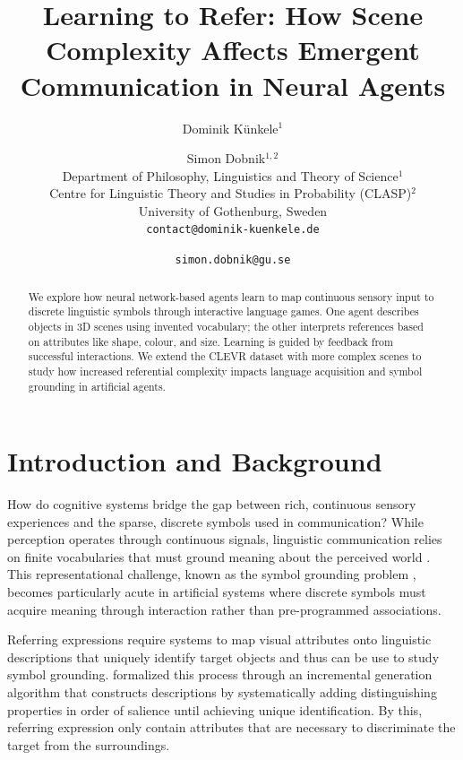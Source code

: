 \documentclass[11pt]{article}
\title{Learning to Refer: How Scene Complexity Affects Emergent Communication in Neural Agents}
\author{Dominik Künkele$^{1}$ \and Simon Dobnik$^{1,2}$ \\
        Department of Philosophy, Linguistics and Theory of Science$^{1}$ \\ 
        Centre for Linguistic Theory and Studies in Probability (CLASP)$^{2}$ \\
        University of Gothenburg, Sweden \\
        \texttt{contact@dominik-kuenkele.de} \and \texttt{simon.dobnik@gu.se}}
\begin{document}
\maketitle
\begin{abstract}
  We explore how neural network-based agents learn to map continuous sensory input to discrete linguistic symbols through interactive language games.
  One agent describes objects in 3D scenes using invented vocabulary; the other interprets references based on attributes like shape, colour, and size. Learning is guided by feedback from successful interactions.
  We extend the CLEVR dataset with more complex scenes to study how increased referential complexity impacts language acquisition and symbol grounding in artificial agents.
\end{abstract}

\section{Introduction and Background}
How do cognitive systems bridge the gap between rich, continuous sensory experiences and the sparse, discrete symbols used in communication? 
While perception operates through continuous signals, linguistic communication relies on finite vocabularies that must ground meaning about the perceived world \citep{Regier1996,Roy2005,Cooper2023}.
This representational challenge, known as the symbol grounding problem \citep{Harnad1990}, becomes particularly acute in artificial systems where discrete symbols must acquire meaning through interaction rather than pre-programmed associations. 

Referring expressions require systems to map visual attributes onto linguistic descriptions that uniquely identify target objects and thus can be use to study symbol grounding.
\citet{Dale1995} formalized this process through an incremental generation algorithm that constructs descriptions by systematically adding distinguishing properties in order of salience until achieving unique identification.
By this, referring expression only contain attributes that are necessary to discriminate the target from the surroundings.
\end{document}
